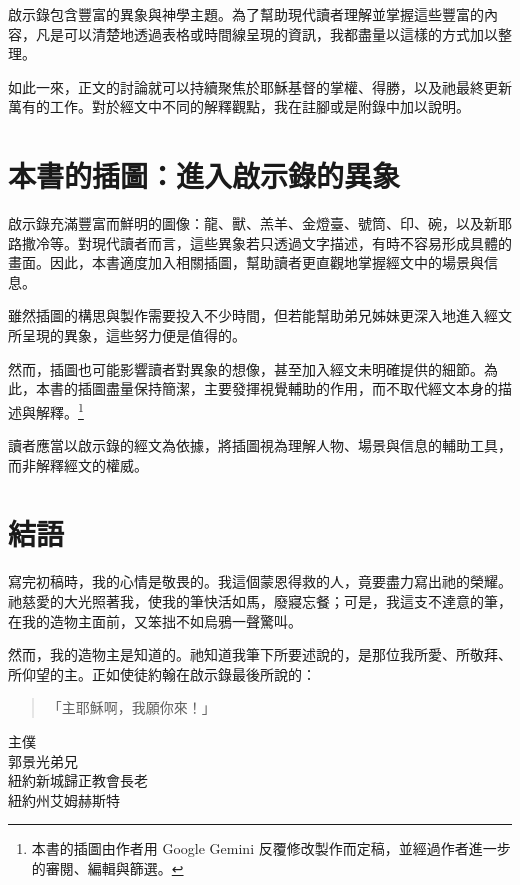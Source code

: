 啟示錄包含豐富的異象與神學主題。為了幫助現代讀者理解並掌握這些豐富的內容，凡是可以清楚地透過表格或時間線呈現的資訊，我都盡量以這樣的方式加以整理。

如此一來，正文的討論就可以持續聚焦於耶穌基督的掌權、得勝，以及祂最終更新萬有的工作。對於經文中不同的解釋觀點，我在註腳或是附錄中加以說明。

\section*{本書的插圖：進入啟示錄的異象}

啟示錄充滿豐富而鮮明的圖像：龍、獸、羔羊、金燈臺、號筒、印、碗，以及新耶路撒冷等。對現代讀者而言，這些異象若只透過文字描述，有時不容易形成具體的畫面。因此，本書適度加入相關插圖，幫助讀者更直觀地掌握經文中的場景與信息。

雖然插圖的構思與製作需要投入不少時間，但若能幫助弟兄姊妹更深入地進入經文所呈現的異象，這些努力便是值得的。

然而，插圖也可能影響讀者對異象的想像，甚至加入經文未明確提供的細節。為此，本書的插圖盡量保持簡潔，主要發揮視覺輔助的作用，而不取代經文本身的描述與解釋。\footnote{本書的插圖由作者用 Google Gemini 反覆修改製作而定稿，並經過作者進一步的審閱、編輯與篩選。}

讀者應當以啟示錄的經文為依據，將插圖視為理解人物、場景與信息的輔助工具，而非解釋經文的權威。


\section*{結語}

寫完初稿時，我的心情是敬畏的。我這個蒙恩得救的人，竟要盡力寫出祂的榮耀。祂慈愛的大光照著我，使我的筆快活如馬，廢寢忘餐；可是，我這支不達意的筆，在我的造物主面前，又笨拙不如烏鴉一聲驚叫。

然而，我的造物主是知道的。祂知道我筆下所要述說的，是那位我所愛、所敬拜、所仰望的主。正如使徒約翰在啟示錄最後所說的：

\begin{quote}
「主耶穌啊，我願你來！」
\end{quote}

\vspace{2em}

\begin{flushright}
主僕  \\
郭景光弟兄\\
紐約新城歸正教會長老  \\
紐約州艾姆赫斯特
\end{flushright}